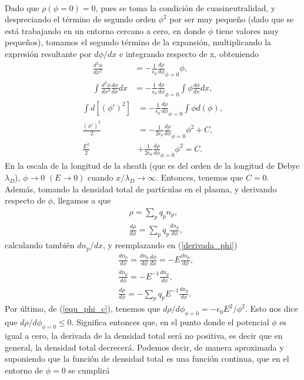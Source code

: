 \documentclass[../main.tex]{subfiles}
\begin{document}
{\begin{align}
    \end{align}
    Dado que $\rho(\phi = 0) = 0$, pues se toma la condición de cuasineutralidad, y despreciando el término de segundo orden $\phi^2$ por ser muy pequeño (dado que se está trabajando en un entorno cercano a cero, en donde $\phi$ tiene valores muy pequeños), tomamos el segundo término de la
    expansión, multiplicando la expresión resultante por $d\phi/dx$ e integrando respecto de x, obteniendo
    \begin{align}
        \frac{d^2\phi}{dx^2} &= -\frac{1}{\epsilon_0}\frac{d\rho}{d\phi}_{\phi=0}\phi, \\
        \int \frac{d^2\phi}{dx^2}\frac{d\phi}{dx} dx &= -\frac{1}{\epsilon_0}\frac{d\rho}{d\phi}_{\phi=0}\int \phi \frac{d\phi}{dx}dx,
    \end{align}
    \begin{align}
        \int d\left[\left(\phi\prime \right)^2 \right] &=  -\frac{1}{\epsilon_0}\frac{d\rho}{d\phi}_{\phi=0}\int\phi d\left(\phi\right), \\ 
        \frac{\left( \phi\prime \right)^2}{2} &= -\frac{1}{2\epsilon_0}\frac{d\rho}{d\phi}_{\phi=0}\phi^2 + C, \\
        \frac{E^2}{2} &+ \frac{1}{2\epsilon_0}\frac{d\rho}{d\phi}_{\phi=0}\phi^2 = C. \label{equ_phi_c}
    \end{align}
    En la escala de la longitud de la sheath (que es del orden de la longitud de Debye $\lambda_D$), $\phi \rightarrow  0$ $(E \rightarrow0)$ cuando $x/\lambda_D \rightarrow \infty$. Entonces, tenemos que $C=0$. Además, tomando la densidad total de partículas en el plasma, y derivando respecto de $\phi$, llegamos a que
    \begin{align}
        &\rho = \sum_p q_pn_p, \\
        &\frac{d\rho}{d\phi} = \sum_p q_p \frac{dn_p}{d\phi}, \label{derivada_phi}
    \end{align}
    calculando también $dn_p/dx$, y reemplazando en (\ref{derivada_phi})
    \begin{align}
        &\frac{dn_p}{dx} = \frac{dn_p}{d\phi}\frac{d\phi}{dx} = -E\frac{dn_p}{d\phi}, \\
        &\frac{dn_p}{d\phi} = -E^{-1}\frac{dn_p}{dx}, \\
        &\frac{d\rho}{d\phi} = - \sum_p q_p E^{-1}\frac{dn_p}{dx}. \label{equ_sum_rho}
    \end{align}
    Por último, de (\ref{equ_phi_c}), tenemos que $d\rho/d\phi_{\phi = 0} = -\epsilon_0E^2/\phi^2$. Esto nos dice que $d\rho/d\phi_{\phi = 0} \leq 0$. Significa entonces que, en el punto donde el potencial $\phi$ es igual a cero, la derivada de la densidad total será no positiva, es decir que en general, la densidad total decrecerá. Podemos decir, de manera aproximada y suponiendo que la función de densidad total es una función continua, que en el entorno de $\phi=0$ se cumplirá
}
\end{document}
